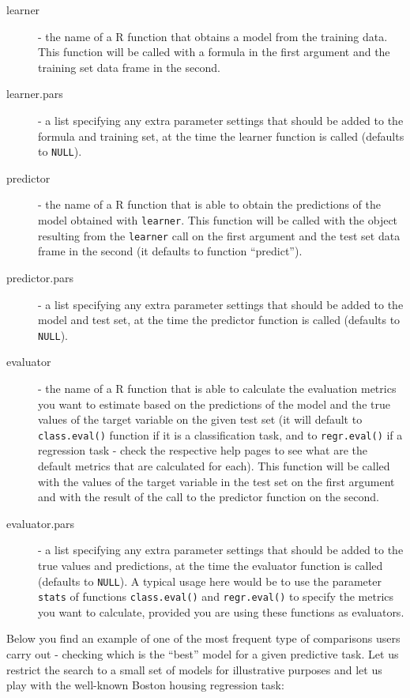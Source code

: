 \documentclass[10pt,a4paper]{article}
\begin{document}
\begin{description}
\item[learner] - the name of a R function that obtains a model from the training data. This function will be called with a formula in the first argument and the training set data frame in the second.
\item[learner.pars] - a list specifying any extra parameter settings that should be added to the formula and training set, at the time the learner function is called (defaults to \texttt{NULL}).
\item[predictor] - the name of a R function that is able to obtain the predictions of the model obtained with \texttt{learner}. This function will be called with the object resulting from the \texttt{learner} call on the first argument and the test set data frame in the second (it defaults to function ``predict'').
\item[predictor.pars] - a list specifying any extra parameter settings that should be added to the model and test set, at the time the predictor function is called (defaults to \texttt{NULL}).
\item[evaluator] - the name of a R function that is able to calculate the evaluation metrics you want to estimate based on the predictions of the model and the true values of the target variable on the given test set (it will default to \texttt{class.eval()} function if it is a classification task, and to \texttt{regr.eval()} if a regression task - check the respective help pages to see what are the default metrics that are calculated for each). This function will be called with the values of the target variable in the test set on the first argument and with the result of the call to the predictor function on the second.
\item[evaluator.pars] -  a list specifying any extra parameter settings that should be added to the true values and predictions, at the time the evaluator function is called (defaults to \texttt{NULL}). A typical usage here would be to use the parameter \texttt{stats} of functions \texttt{class.eval()} and \texttt{regr.eval()} to specify the metrics you want to calculate, provided you are using these functions as evaluators.
\end{description}


Below you find an example of one of the most frequent type of
comparisons users carry out - checking which is the ``best'' model for
a given predictive task. Let us restrict the search to a small set of
models for illustrative purposes and let us play with the well-known
Boston housing regression task:
\end{document}
